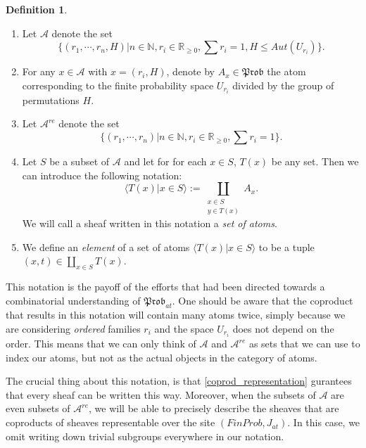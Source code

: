 \documentclass[a4paper]{amsproc}
\theoremstyle{plain}
\theoremstyle{definition}
\newtheorem{definition}[theorem]{Definition}
\theoremstyle{remark}
\numberwithin{equation}{section}
\begin{document}
\begin{definition}
    \begin{enumerate}
        \item Let $\mathcal{A}$ denote the set 
        \[
            \{(r_1, \cdots, r_n, H) | n \in \mathbb{N}, r_i \in \mathbb{R}_{\geq 0}, \sum r_i = 1, H \leq Aut(U_{r_i})\}.
        \]
        \item For any $x \in \mathcal{A}$ with $x = (r_i, H)$, denote by $A_x \in \mathfrak{Prob}$ the atom corresponding to the finite probability space $U_{r_i}$ divided by the group of permutations $H$.
        \item Let $\mathcal{A}^{re}$ denote the set
        \[
            \{(r_1,\cdots, r_n) | n \in \mathbb{N}, r_i \in \mathbb{R}_{\geq 0}, \sum r_i = 1\}.
        \]
        \item Let $S$ be a subset of $\mathcal{A}$ and let for for each $x \in S$, $T(x)$ be any set. Then we can introduce the following notation:
        \[
            \langle T(x) | x \in S \rangle := \coprod_{\substack{x \in S \\ y \in T(x)}} A_x .
        \]
        We will call a sheaf written in this notation a \emph{set of atoms}.
        \item We define an \emph{element} of a set of atoms $\langle T(x) | x \in S \rangle$ to be a tuple $(x,t) \in \coprod_{x \in S} T(x)$.
    \end{enumerate}
\end{definition}

This notation is the payoff of the efforts that had been directed towards a combinatorial understanding of $\mathfrak{Prob}_{at}$. One should be aware that the coproduct that results in this notation will contain many atoms twice, simply because we are considering \emph{ordered} families $r_i$ and the space $U_{r_i}$ does not depend on the order. This means that we can only think of $\mathcal{A}$ and $\mathcal{A}^{re}$ as sets that we can use to index our atoms, but not as the actual objects in the category of atoms.

The crucial thing about this notation, is that \ref{coprod_representation} gurantees that every sheaf can be written this way. Moreover, when the subsets of $\mathcal{A}$ are even subsets of $\mathcal{A}^{re}$, we will be able to precisely describe the sheaves that are coproducts of sheaves representable over the site $(FinProb, J_{at})$. In this case, we omit writing down trivial subgroups everywhere in our notation.
\end{document}

